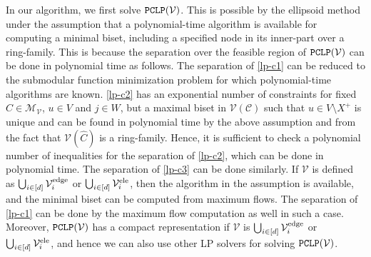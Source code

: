 \documentclass[11pt]{article}
\newcommand{\Mfam}{\mathcal{M}}
\newcommand{\Cfam}{\mathcal{C}}
\newcommand{\Vfam}{\mathcal{V}}
\newcommand{\LP}{{\tt PCLP}}
\begin{document}
In our algorithm, we first solve $\LP(\Vfam)$.
This is possible by the ellipsoid method 
under the assumption that 
a polynomial-time algorithm is available for computing
a minimal biset, including a specified node in its inner-part
over a ring-family.
This is
because the separation over the feasible region of $\LP(\Vfam)$ can be
done in polynomial time as follows.
The separation of \eqref{lp-c1} can be reduced to the submodular
function minimization problem for which polynomial-time algorithms are
known.
\eqref{lp-c2} has an exponential number of constraints for fixed $\hat{C}\in
\Mfam_{\Vfam}$, $u \in V$ and $j \in W$,
but a maximal biset in $\Vfam(\Cfam)$ such that $u \in V\setminus X^+$ is
unique and can be found in polynomial time by the above assumption and
from the fact that $\Vfam(\hat{C})$ is a ring-family.
Hence, it is sufficient to check a polynomial number of inequalities for the
separation of \eqref{lp-c2}, which can be done in
polynomial time.
The separation of \eqref{lp-c3} can be done similarly.
If $\Vfam$ is defined as $\bigcup_{i\in [d]}\Vfam_i^{\rm edge}$ or
$\bigcup_{i\in [d]}\Vfam_i^{\rm ele}$,
then the algorithm in the assumption is available, and the minimal biset can
be computed from maximum flows.
The separation of \eqref{lp-c1} can be done by the maximum flow
computation as well in such a case.
Moreover, $\LP(\Vfam)$ has a compact representation if
$\Vfam$ is $\bigcup_{i \in [d]}\Vfam_i^{\rm edge}$ or $\bigcup_{i \in
[d]}\Vfam_i^{\rm ele}$, 
and hence we can also use other LP solvers for solving
$\LP(\Vfam)$.
\end{document}
